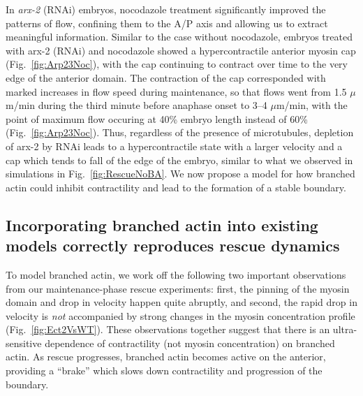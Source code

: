 \documentclass[11pt]{article}
\newcommand{\6}[1]{#1_{\text{6}}}
\newcommand{\3}[1]{#1_{\text{3}}}
\begin{document}
In \emph{arx-2} (RNAi) embryos, nocodazole treatment significantly improved the patterns of flow, confining them to the A/P axis and allowing us to extract meaningful information. Similar to the case without nocodazole, embryos treated with arx-2 (RNAi) and nocodazole showed a hypercontractile anterior myosin cap (Fig.\ \ref{fig:Arp23Noc}), with the cap continuing to contract over time to the very edge of the anterior domain. The contraction of the cap corresponded with marked increases in flow speed during maintenance, so that flows went from 1.5 $\mu$m/min during the third minute before anaphase onset to 3--4 $\mu$m/min, with the point of maximum flow occuring at 40\% embryo length instead of 60\% (Fig.\ \ref{fig:Arp23Noc}). Thus, regardless of the presence of microtubules, depletion of arx-2 by RNAi leads to a hypercontractile state with a larger velocity and a cap which tends to fall of the edge of the embryo, similar to what we observed in simulations in Fig.\ \ref{fig:RescueNoBA}. We now propose a model for how branched actin could inhibit contractility and lead to the formation of a stable boundary.

\subsection*{Incorporating branched actin into existing models correctly reproduces rescue dynamics}
To model branched actin, we work off the following two important observations from our maintenance-phase rescue experiments: first, the pinning of the myosin domain and drop in velocity happen quite abruptly, and second, the rapid drop in velocity is \emph{not} accompanied by strong changes in the myosin concentration profile (Fig.\ \ref{fig:Ect2VsWT}). These observations together suggest that there is an ultra-sensitive dependence of contractility (not myosin concentration) on branched actin. As rescue progresses, branched actin becomes active on the anterior, providing a ``brake'' which slows down contractility and progression of the boundary.
\end{document}
